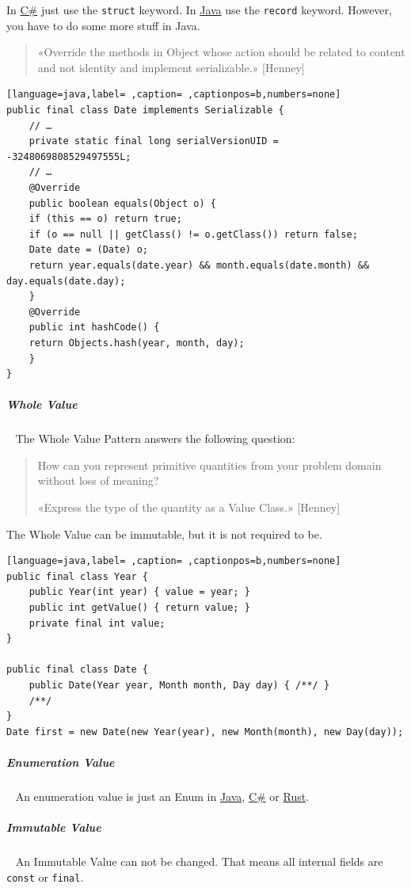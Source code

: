 \documentclass[11pt,twoside,landscape]{article}
\begin{document}
\begin{multicols}{3}
In \href{../../../roam/20211003114158-c.org}{C\#} just use the \texttt{struct} keyword.
In \href{../../../roam/20201116150053-java.org}{Java} use the \texttt{record} keyword.
However, you have to do some more stuff in Java.

\begin{quote}
«Override the methods in Object whose action should be related to content and not
identity and implement serializable.» [Henney]
\end{quote}

\begin{lstlisting}[language=java,label= ,caption= ,captionpos=b,numbers=none]
public final class Date implements Serializable {
    // …
    private static final long serialVersionUID = -3248069808529497555L;
    // …
    @Override
    public boolean equals(Object o) {
	if (this == o) return true;
	if (o == null || getClass() != o.getClass()) return false;
	Date date = (Date) o;
	return year.equals(date.year) && month.equals(date.month) && day.equals(date.day);
    }
    @Override
    public int hashCode() {
	return Objects.hash(year, month, day);
    }
}
\end{lstlisting}
\subparagraph{Whole Value} \
\label{sec:org44fbd1c}
The Whole Value Pattern answers the following question:
\begin{quote}
How can you represent primitive quantities from your problem domain without loss
of meaning?

«Express the type of the quantity as a Value Class.» [Henney]
\end{quote}

The Whole Value can be immutable, but it is not required to be.

\begin{lstlisting}[language=java,label= ,caption= ,captionpos=b,numbers=none]
public final class Year {
    public Year(int year) { value = year; }
    public int getValue() { return value; }
    private final int value;
}

public final class Date {
    public Date(Year year, Month month, Day day) { /**/ }
    /**/
}
Date first = new Date(new Year(year), new Month(month), new Day(day));
\end{lstlisting}
\subparagraph{Enumeration Value} \
\label{sec:org56673d6}
An enumeration value is just an Enum in \href{../../../roam/20201116150053-java.org}{Java}, \href{../../../roam/20211003114158-c.org}{C\#} or \href{../../../roam/20200904153952-rust.org}{Rust}.
\subparagraph{Immutable Value} \
\label{sec:org9349a44}
An Immutable Value can not be changed.
That means all internal fields are \texttt{const} or \texttt{final}.


\end{multicols}
\end{document}
